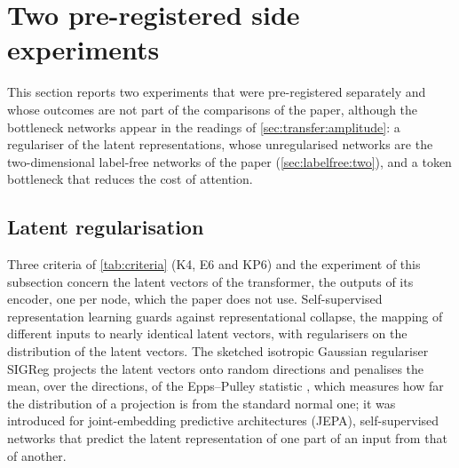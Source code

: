 \section{Two pre-registered side experiments}\label{app:e1}

This section reports two experiments that were pre-registered separately and whose outcomes
are not part of the comparisons of the paper, although the bottleneck networks appear in the
readings of \cref{sec:transfer:amplitude}: a regulariser of the latent representations,
whose unregularised networks are the two-dimensional label-free networks of the paper
(\cref{sec:labelfree:two}), and a token bottleneck that reduces the cost of attention.

\subsection{Latent regularisation}\label{app:e1:latent}

Three criteria of \cref{tab:criteria} (K4, E6 and KP6) and the experiment of this
subsection concern the latent vectors of the transformer, the outputs of its encoder, one
per node, which the paper does not use. Self-supervised representation learning
guards against representational collapse, the mapping of different inputs to nearly
identical latent vectors, with regularisers on the distribution of the latent vectors. The
sketched isotropic Gaussian regulariser SIGReg \cite{Balestriero2025LeJEPA} projects the
latent vectors onto random directions and penalises the mean, over the directions, of the
Epps--Pulley statistic \cite{EppsPulley1983}, which measures how far the distribution of a
projection is from the standard normal one; it was introduced for joint-embedding
predictive architectures (JEPA), self-supervised networks that predict the latent
representation of one part of an input from that of another.

